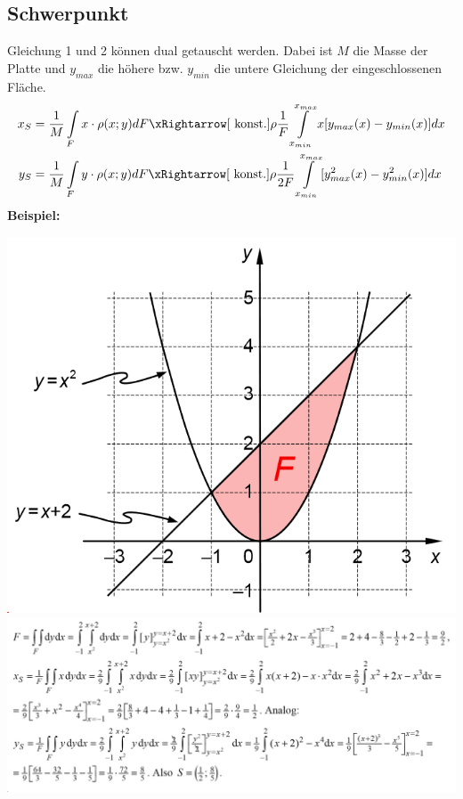\subsection{Schwerpunkt}
Gleichung 1 und 2 können dual getauscht werden. Dabei ist $M$ die Masse der Platte und $y_{max}$ die höhere bzw. $y_{min}$ die untere Gleichung der eingeschlossenen Fläche.
\begin{align*}
		x_S &= \frac{1}{M}\int\limits_{F}^{}x\cdot \rho(x;y)dF \xRightarrow[\text{ konst.}]{\rho} \frac{1}{F}\int\limits_{x_{min}}^{x_{max}}x[y_{max}(x) - y_{min}(x)]dx\\
		y_S &= \frac{1}{M}\int\limits_{F}^{}y\cdot \rho(x;y)dF \xRightarrow[\text{ konst.}]{\rho} \frac{1}{2F}\int\limits_{x_{min}}^{x_{max}}[y^2_{max}(x) - y^2_{min}(x)]dx
\end{align*}
\textbf{Beispiel:}
\begin{center}
	\includegraphics[width=0.5\columnwidth]{Images/schnittpunkt}\\
	\includegraphics[width=\columnwidth]{Images/schnittpunkt1}
\end{center}



